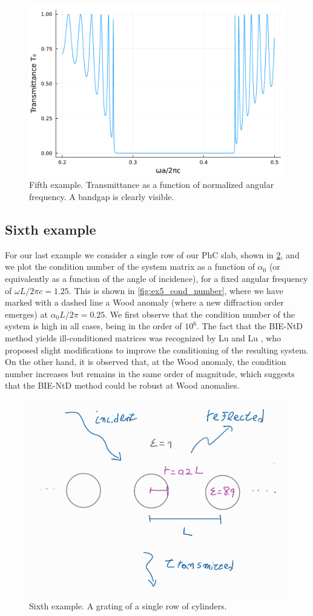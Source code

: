 \documentclass[reprint,amsmath,amssymb,
 aps]{revtex4-2}
\begin{document}
\begin{figure}[h!]
\includegraphics[width=0.6\columnwidth]{figures/ex5_multiple_wl.pdf}
\caption{Fifth example. Transmittance as a function of normalized angular frequency. A bandgap is clearly visible.}
\label{fig:ex5_multiple_wl}
\end{figure}

\subsection{Sixth example}
For our last example we consider a single row of our PhC slab, shown in \cref{fig:phc_singlelayer}, and we plot the condition number of the system matrix as a function of $\alpha_0$ (or equivalently as a function of the angle of incidence), for a fixed angular frequency of $\omega L / 2\pi c = 1.25$. This is shown in \cref{fig:ex5_cond_number}, where we have marked with a dashed line a Wood anomaly (where a new diffraction order emerges) at $\alpha_0 L / 2\pi = 0.25$. We first observe that the condition number of the system is high in all cases, being in the order of $10^6$. The fact that the BIE-NtD method yields ill-conditioned matrices was recognized by Lu and Lu \cite{lu2012high}, who proposed slight modifications to improve the conditioning of the resulting system. On the other hand, it is observed that, at the Wood anomaly, the condition number increases but remains in the same order of magnitude, which suggests that the BIE-NtD method could be robust at Wood anomalies.

\begin{figure}[h!]
\includegraphics[width=0.6\columnwidth]{figures/phc_singlelayer.jpg}
\caption{Sixth example. A grating of a single row of cylinders.}
\label{fig:phc_singlelayer}
\end{figure}
\end{document}
